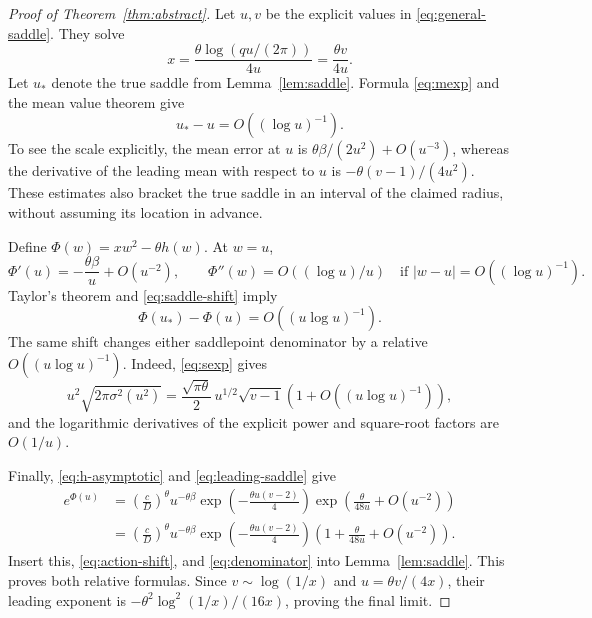 \documentclass[11pt]{article}
\theoremstyle{remark}\newtheorem{remark}[theorem]{Remark}
\begin{document}
\begin{proof}[Proof of Theorem~\ref{thm:abstract}]
Let $u,v$ be the explicit values in \eqref{eq:general-saddle}. They solve
\begin{equation}\label{eq:leading-saddle}
 x=\frac{\theta\log(qu/(2\pi))}{4u}=\frac{\theta v}{4u}.
\end{equation}
Let $u_*$ denote the true saddle from Lemma~\ref{lem:saddle}. Formula
\eqref{eq:mexp} and the mean value theorem give
\begin{equation}\label{eq:saddle-shift}
 u_*-u=O((\log u)^{-1}).
\end{equation}
To see the scale explicitly, the mean error at $u$ is
$\theta\beta/(2u^2)+O(u^{-3})$, whereas the derivative of the leading
mean with respect to $u$ is
$-\theta(v-1)/(4u^2)$. These estimates also bracket the true saddle in
an interval of the claimed radius, without assuming its location in
advance.

Define $\Phi(w)=xw^2-\theta h(w)$. At $w=u$,
\[
 \Phi'(u)=-\frac{\theta\beta}{u}+O(u^{-2}),
 \qquad
 \Phi''(w)=O((\log u)/u)
 \quad\text{if }|w-u|=O((\log u)^{-1}).
\]
Taylor's theorem and \eqref{eq:saddle-shift} imply
\begin{equation}\label{eq:action-shift}
 \Phi(u_*)-\Phi(u)=O((u\log u)^{-1}).
\end{equation}
The same shift changes either saddlepoint denominator by a relative
$O((u\log u)^{-1})$. Indeed, \eqref{eq:sexp} gives
\begin{equation}\label{eq:denominator}
 u^2\sqrt{2\pi\sigma^2(u^2)}
 =\frac{\sqrt{\pi\theta}}2\,
   u^{1/2}\sqrt{v-1}
   \left(1+O((u\log u)^{-1})\right),
\end{equation}
and the logarithmic derivatives of the explicit power and square-root
factors are $O(1/u)$.

Finally, \eqref{eq:h-asymptotic} and \eqref{eq:leading-saddle} give
\begin{align*}
 e^{\Phi(u)}
 &=\left(\frac cD\right)^\theta u^{-\theta\beta}
   \exp\!\left(-\frac{\theta u(v-2)}4\right)
   \exp\!\left(\frac{\theta}{48u}+O(u^{-2})\right)\\
 &=\left(\frac cD\right)^\theta u^{-\theta\beta}
   \exp\!\left(-\frac{\theta u(v-2)}4\right)
   \left(1+\frac{\theta}{48u}+O(u^{-2})\right).
\end{align*}
Insert this, \eqref{eq:action-shift}, and \eqref{eq:denominator} into
Lemma~\ref{lem:saddle}. This proves both relative formulas. Since
$v\sim\log(1/x)$ and $u=\theta v/(4x)$, their leading exponent is
$-\theta^2\log^2(1/x)/(16x)$, proving the final limit.
\end{proof}
\end{document}
